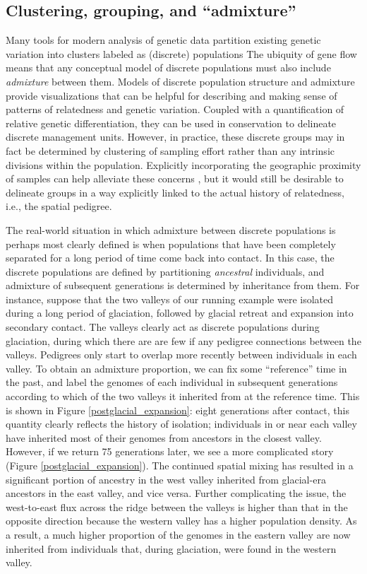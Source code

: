 \documentclass{ar-1col}
\renewcommand{\emph}[1]{{\textit{#1}}}
\begin{document}
\subsection{Clustering, grouping, and ``admixture''}

Many tools for modern analysis of genetic data
partition existing genetic variation into clusters labeled as (discrete) populations
\citep[e.g.,][]{STRUCTURE, ADMIXTURE}
The ubiquity of gene flow means that
any conceptual model of discrete populations 
must also include \emph{admixture} between them.
Models of discrete population structure and admixture 
provide visualizations that can be helpful for
describing and making sense of patterns of relatedness and genetic variation.
Coupled with a quantification of relative genetic differentiation,
they can be used in conservation to delineate discrete management units.
However, in practice, these discrete groups may in fact be determined
by clustering of sampling effort rather than any intrinsic divisions within the population.
Explicitly incorporating the geographic proximity of samples 
can help alleviate these concerns \citep{spacemix,conStruct},
but it would still be desirable to delineate groups in a way explicitly linked
to the actual history of relatedness, i.e., the spatial pedigree.

The real-world situation in which admixture between discrete populations 
is perhaps most clearly defined is when populations that have been completely separated
for a long period of time come back into contact.
In this case, the discrete populations are defined by partitioning \emph{ancestral} individuals,
and admixture of subsequent generations is determined by inheritance from them.
For instance, suppose that 
the two valleys of our running example
were isolated during a long period of glaciation,
followed by glacial retreat and expansion into secondary contact.
The valleys clearly act as discrete populations during glaciation, 
during which there are are few if any pedigree connections between the valleys.
Pedigrees only start to overlap more recently between individuals in each valley.
To obtain an admixture proportion,
we can fix some ``reference'' time in the past,
and label the genomes of each individual in subsequent generations 
according to which of the two valleys it inherited from at the reference time.
This is shown in Figure \ref{postglacial_expansion}:
eight generations after contact,
this quantity clearly reflects the history of isolation;  
individuals in or near each valley have inherited most of their genomes 
from ancestors in the closest valley.
However, if we return 75 generations later, 
we see a more complicated story (Figure \ref{postglacial_expansion}).
The continued spatial mixing has resulted in a significant 
portion of ancestry in the west valley inherited from 
glacial-era ancestors in the east valley, 
and vice versa.
Further complicating the issue, 
the west-to-east flux across the ridge between the valleys 
is higher than that in the opposite direction 
because the western valley has a higher population density. 
As a result, a much higher proportion of the genomes
in the eastern valley are now inherited 
from individuals that, 
during glaciation, were found in the western valley.
\end{document}
